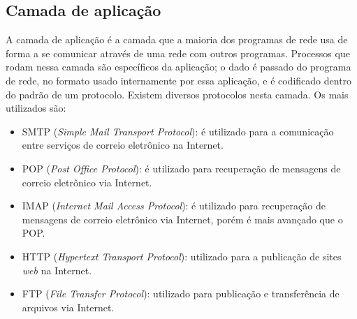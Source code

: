 \subsection{Camada de aplicação}
A camada de aplicação é a camada que a maioria dos programas de rede usa de 
forma a se comunicar através de uma rede com outros programas. Processos que 
rodam nessa camada são específicos da aplicação; o dado é passado do programa 
de rede, no formato usado internamente por essa aplicação, e é codificado 
dentro do padrão de um protocolo. Existem diversos protocolos nesta camada. Os 
mais utilizados são:
\begin{itemize}
	\item SMTP (\textit{Simple Mail Transport Protocol}): é utilizado para a 
	comunicação entre serviços de correio eletrônico na Internet.
	\item POP (\textit{Post Office Protocol}): é utilizado para recuperação de 
	mensagens de correio eletrônico via Internet.
	\item IMAP (\textit{Internet Mail Access Protocol}): é utilizado para 
	recuperação de mensagens de correio eletrônico via Internet, porém é mais 
	avançado que o POP.
	\item HTTP (\textit{Hypertext Transport Protocol}): utilizado para a 
	publicação de sites \textit{web} na Internet.
	\item FTP (\textit{File Transfer Protocol}): utilizado para publicação e 
	transferência de arquivos via Internet.
\end{itemize}
